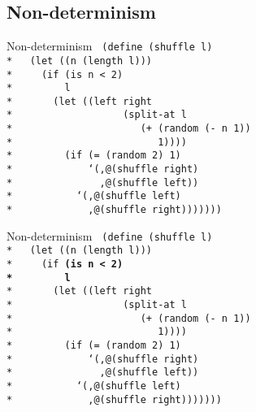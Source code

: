 \subsection{Non-determinism}

\begin{frame}{Non-determinism}
  \texttt{
    (define (shuffle l)\\*
    \ \ (let ((n (length l)))\\*
    \ \ \ \ (if (is n < 2)\\*
    \ \ \ \ \ \ \ \ l\\*
    \ \ \ \ \ \ (let ((left right\\*
    \ \ \ \ \ \ \ \ \ \ \ \ \ \ \ \ \ \ (split-at l\\*
    \ \ \ \ \ \ \ \ \ \ \ \ \ \ \ \ \ \ \ \ \ (+ (random (- n 1))\\*
    \ \ \ \ \ \ \ \ \ \ \ \ \ \ \ \ \ \ \ \ \ \ \ \ 1))))\\*
    \ \ \ \ \ \ \ \ (if (= (random 2) 1)\\*
    \ \ \ \ \ \ \ \ \ \ \ \ `(,@(shuffle right)\\*
    \ \ \ \ \ \ \ \ \ \ \ \ \ \ ,@(shuffle left))\\*
    \ \ \ \ \ \ \ \ \ \ `(,@(shuffle left)\\*
    \ \ \ \ \ \ \ \ \ \ \ \ ,@(shuffle right)))))))
    }
\end{frame}

\begin{frame}{Non-determinism}
  \texttt{
    (define (shuffle l)\\*
    \ \ (let ((n (length l)))\\*
    \ \ \ \ (if \textbf{(is n < 2)\\*
    \ \ \ \ \ \ \ \ l}\\*
    \ \ \ \ \ \ (let ((left right\\*
    \ \ \ \ \ \ \ \ \ \ \ \ \ \ \ \ \ \ (split-at l\\*
    \ \ \ \ \ \ \ \ \ \ \ \ \ \ \ \ \ \ \ \ \ (+ (random (- n 1))\\*
    \ \ \ \ \ \ \ \ \ \ \ \ \ \ \ \ \ \ \ \ \ \ \ \ 1))))\\*
    \ \ \ \ \ \ \ \ (if (= (random 2) 1)\\*
    \ \ \ \ \ \ \ \ \ \ \ \ `(,@(shuffle right)\\*
    \ \ \ \ \ \ \ \ \ \ \ \ \ \ ,@(shuffle left))\\*
    \ \ \ \ \ \ \ \ \ \ `(,@(shuffle left)\\*
    \ \ \ \ \ \ \ \ \ \ \ \ ,@(shuffle right)))))))
    }
\end{frame}

